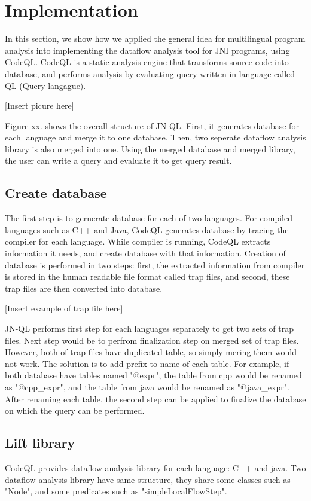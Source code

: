\section{Implementation}
In this section, we show how we applied the general idea for multilingual
program analysis into implementing the dataflow analysis tool for JNI programs,
using CodeQL. CodeQL is a static analysis engine that transforms source code
into database, and performs analysis by evaluating query written in language
called QL (Query langague).

[Insert picure here]

Figure xx. shows the overall structure of JN-QL. First, it generates database
for each language and merge it to one database. Then, two seperate dataflow
analysis library is also merged into one. Using the merged database and
merged library, the user can write a query and evaluate it to get query
result.

\subsection{Create database}
The first step is to gernerate database for each of two languages.  For
compiled languages such as C++ and Java, CodeQL generates database by tracing
the compiler for each language. While compiler is running, CodeQL extracts
information it needs, and create database with that information.  Creation of
database is performed in two steps: first, the extracted information from
compiler is stored in the human readable file format called trap files, and
second, these trap files are then converted into database.

[Insert example of trap file here]

JN-QL performs first step for each languages separately to get two sets of trap
files.  Next step would be to perfrom finalization step on merged set of trap
files. However, both of trap files have duplicated table, so simply mering them
would not work. The solution is to add prefix to name of each table. For
example, if both database have tables named "@expr", the table from cpp would
be renamed as "@cpp\_expr", and the table from java would be renamed as
"@java\_expr". After renaming each table, the second step can be applied to
finalize the database on which the query can be performed.

\subsection{Lift library}
CodeQL provides dataflow analysis library for each language: C++ and java.
Two dataflow analysis library have same structure, they share some classes such
as "Node", and some predicates such as "simpleLocalFlowStep".

